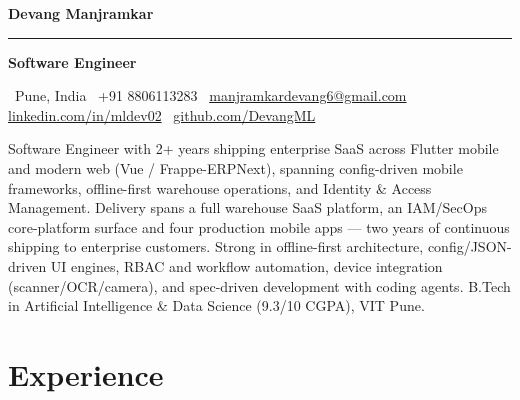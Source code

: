 \documentclass[a4paper,10pt]{article}
\begin{document}
{\fontsize{26}{28}\selectfont\bfseries\color{accent} Devang Manjramkar}
\par\vspace{3pt}
{\color{spark}\rule{72pt}{2.2pt}}
\par\vspace{5pt}
{\small\color{ink}\bfseries Software Engineer}
\par\vspace{4pt}
{\footnotesize\color{muted}
  \faMapMarker* \, Pune, India \quad
  \faPhone* \, +91 8806113283 \quad
  \faEnvelope \, \href{mailto:manjramkardevang6@gmail.com}{manjramkardevang6@gmail.com} \quad
  \faLinkedin \, \href{https://www.linkedin.com/in/mldev02}{linkedin.com/in/mldev02} \quad
  \faGithub \, \href{https://github.com/DevangML}{github.com/DevangML}
}

\vspace{8pt}
\colorbox{wash}{%
\begin{minipage}{\dimexpr\linewidth-2\fboxsep\relax}
\vspace{3pt}
\small Software Engineer with 2+ years shipping enterprise SaaS across Flutter mobile and modern web (Vue / Frappe-ERPNext), spanning config-driven mobile frameworks, offline-first warehouse operations, and Identity \& Access Management. Delivery spans a full warehouse SaaS platform, an IAM/SecOps core-platform surface and four production mobile apps --- two years of continuous shipping to enterprise customers. Strong in offline-first architecture, config/JSON-driven UI engines, RBAC and workflow automation, device integration (scanner/OCR/camera), and spec-driven development with coding agents. B.Tech in Artificial Intelligence \& Data Science (9.3/10 CGPA), VIT Pune.
\vspace{4pt}
\end{minipage}}

\section*{Experience}
\end{document}
